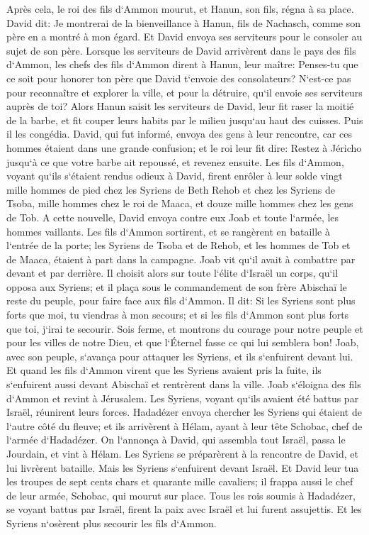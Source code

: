 \verse Après cela, le roi des fils d`Ammon mourut, et Hanun, son fils, régna à sa place. 
\verse David dit: Je montrerai de la bienveillance à Hanun, fils de Nachasch, comme son père en a montré à mon égard. Et David envoya ses serviteurs pour le consoler au sujet de son père. Lorsque les serviteurs de David arrivèrent dans le pays des fils d`Ammon, 
\verse les chefs des fils d`Ammon dirent à Hanun, leur maître: Penses-tu que ce soit pour honorer ton père que David t`envoie des consolateurs? N`est-ce pas pour reconnaître et explorer la ville, et pour la détruire, qu`il envoie ses serviteurs auprès de toi? 
\verse Alors Hanun saisit les serviteurs de David, leur fit raser la moitié de la barbe, et fit couper leurs habits par le milieu jusqu`au haut des cuisses. Puis il les congédia. 
\verse David, qui fut informé, envoya des gens à leur rencontre, car ces hommes étaient dans une grande confusion; et le roi leur fit dire: Restez à Jéricho jusqu`à ce que votre barbe ait repoussé, et revenez ensuite. 
\verse Les fils d`Ammon, voyant qu`ils s`étaient rendus odieux à David, firent enrôler à leur solde vingt mille hommes de pied chez les Syriens de Beth Rehob et chez les Syriens de Tsoba, mille hommes chez le roi de Maaca, et douze mille hommes chez les gens de Tob. 
\verse A cette nouvelle, David envoya contre eux Joab et toute l`armée, les hommes vaillants. 
\verse Les fils d`Ammon sortirent, et se rangèrent en bataille à l`entrée de la porte; les Syriens de Tsoba et de Rehob, et les hommes de Tob et de Maaca, étaient à part dans la campagne. 
\verse Joab vit qu`il avait à combattre par devant et par derrière. Il choisit alors sur toute l`élite d`Israël un corps, qu`il opposa aux Syriens; 
\verse et il plaça sous le commandement de son frère Abischaï le reste du peuple, pour faire face aux fils d`Ammon. 
\verse Il dit: Si les Syriens sont plus forts que moi, tu viendras à mon secours; et si les fils d`Ammon sont plus forts que toi, j`irai te secourir. 
\verse Sois ferme, et montrons du courage pour notre peuple et pour les villes de notre Dieu, et que l`Éternel fasse ce qui lui semblera bon! 
\verse Joab, avec son peuple, s`avança pour attaquer les Syriens, et ils s`enfuirent devant lui. 
\verse Et quand les fils d`Ammon virent que les Syriens avaient pris la fuite, ils s`enfuirent aussi devant Abischaï et rentrèrent dans la ville. Joab s`éloigna des fils d`Ammon et revint à Jérusalem. 
\verse Les Syriens, voyant qu`ils avaient été battus par Israël, réunirent leurs forces. 
\verse Hadadézer envoya chercher les Syriens qui étaient de l`autre côté du fleuve; et ils arrivèrent à Hélam, ayant à leur tête Schobac, chef de l`armée d`Hadadézer. 
\verse On l`annonça à David, qui assembla tout Israël, passa le Jourdain, et vint à Hélam. Les Syriens se préparèrent à la rencontre de David, et lui livrèrent bataille. 
\verse Mais les Syriens s`enfuirent devant Israël. Et David leur tua les troupes de sept cents chars et quarante mille cavaliers; il frappa aussi le chef de leur armée, Schobac, qui mourut sur place. 
\verse Tous les rois soumis à Hadadézer, se voyant battus par Israël, firent la paix avec Israël et lui furent assujettis. Et les Syriens n`osèrent plus secourir les fils d`Ammon. 

